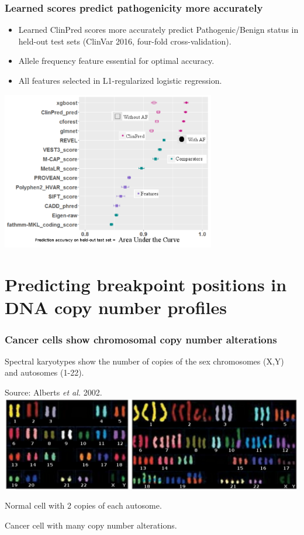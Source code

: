 \documentclass{beamer}
\begin{document}
\begin{frame}
  \frametitle{Learned scores predict pathogenicity more accurately}
  \begin{itemize}
  \item Learned ClinPred scores more accurately predict
    Pathogenic/Benign status in held-out test sets (ClinVar 2016,
    four-fold cross-validation).
  \item Allele frequency feature essential for optimal accuracy.
  \item All features selected in L1-regularized logistic regression.
  \end{itemize}
\includegraphics[width=0.7\textwidth]{Screenshot-clinpred-auc}
\end{frame}
\section{Predicting breakpoint positions in DNA copy number profiles}

\begin{frame}
  \frametitle{Cancer cells show chromosomal copy number alterations}
  Spectral karyotypes show the number of copies of the sex chromosomes
  (X,Y) and autosomes (1-22). 

  Source: Alberts \emph{et al.} 2002.
\vskip 0.1in
  \includegraphics[width=\textwidth]{Karyo-both}
\vskip 0.1in
  \begin{minipage}{0.4\linewidth}
    Normal cell with 2 copies of each autosome.
  \end{minipage}
\linewidth
  \begin{minipage}{0.4\linewidth}
Cancer cell with many copy number alterations.
  \end{minipage}
\end{frame}
\end{document}
